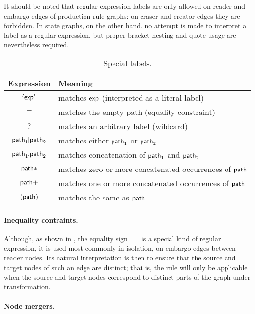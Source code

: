 It should be noted that regular expression labels are only allowed on reader
and embargo edges of production rule graphs: on eraser and creator edges they
are forbidden. In state graphs, on the other hand, no attempt is made to
interpret a label as a regular expression, but proper bracket nesting and quote
usage are nevertheless required.
%
\begin{table}
\begin{center}
\begin{tabular}{|c|l|}
\hline\hline
\bf Expression & \bf Meaning \\
\hline
$'\mathsf{exp}'$ & matches $\mathsf{exp}$ (interpreted as a literal label) \\
$=$ & matches the empty path (equality constraint) \\
$?$ & matches an arbitrary label (wildcard) \\
\hline
$\mathsf{path}_1|\mathsf{path}_2$ & matches either $\mathsf{path}_1$ or $\mathsf{path}_2$ \\
$\mathsf{path}_1.\mathsf{path}_2$ & matches concatenation of $\mathsf{path}_1$ and $\mathsf{path}_2$ \\
\hline
$\mathsf{path}{*}$ & matches zero or more concatenated occurrences of $\mathsf{path}$ \\
$\mathsf{path}{+}$ & matches one or more concatenated occurrences of $\mathsf{path}$ \\
\hline
$(\mathsf{path})$ & matches the same as $\mathsf{path}$ \\
\hline
\hline\hline
\end{tabular}
\end{center}
\caption{Special labels.}
\end{table}

\paragraph{Inequality contraints.}

Although, as shown in , the equality sign $=$ is a special kind of
regular expression, it is used most commonly in isolation, on embargo edges
between reader nodes. Its natural interpretation is then to ensure that the
source and target nodes of such an edge are distinct; that is, the rule will
only be applicable when the source and target nodes correspond to distinct
parts of the graph under transformation.

\paragraph{Node mergers.}

